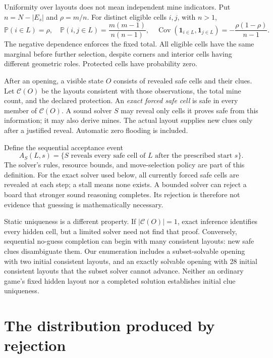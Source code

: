 \documentclass[11pt]{article}
\newcommand{\Prb}{\mathbb P}
\newcommand{\ind}{\mathbf 1}
\begin{document}
Uniformity over layouts does not mean independent mine indicators. Put $n=N-|E_s|$ and $\rho=m/n$. For distinct eligible cells $i,j$, with $n>1$,
\begin{equation}
 \Prb(i\in L)=\rho,\quad
 \Prb(i,j\in L)=\frac{m(m-1)}{n(n-1)},\quad
 \operatorname{Cov}(\ind_{i\in L},\ind_{j\in L})=-\frac{\rho(1-\rho)}{n-1}.
 \label{eq:cov}
\end{equation}
The negative dependence enforces the fixed total. All eligible cells have the same marginal before further selection, despite corners and interior cells having different geometric roles. Protected cells have probability zero.

After an opening, a visible state $O$ consists of revealed safe cells and their clues. Let $\mathcal C(O)$ be the layouts consistent with those observations, the total mine count, and the declared protection. An \emph{exact forced safe cell} is safe in every member of $\mathcal C(O)$. A sound solver $S$ may reveal only cells it proves safe from this information; it may also derive mines. The actual layout supplies new clues only after a justified reveal. Automatic zero flooding is included.

Define the sequential acceptance event
\begin{equation}
 A_S(L,s)=\{S\text{ reveals every safe cell of }L\text{ after the prescribed start }s\}.
 \label{eq:event}
\end{equation}
The solver's rules, resource bounds, and move-selection policy are part of this definition. For the exact solver used below, all currently forced safe cells are revealed at each step; a stall means none exists. A bounded solver can reject a board that stronger sound reasoning completes. Its rejection is therefore not evidence that guessing is mathematically necessary.

Static uniqueness is a different property. If $|\mathcal C(O)|=1$, exact inference identifies every hidden cell, but a limited solver need not find that proof. Conversely, sequential no-guess completion can begin with many consistent layouts: new safe clues disambiguate them. Our enumeration includes a subset-solvable opening with two initial consistent layouts, and an exactly solvable opening with 28 initial consistent layouts that the subset solver cannot advance. Neither an ordinary game's fixed hidden layout nor a completed solution establishes initial clue uniqueness.

\section{The distribution produced by rejection}
\end{document}
